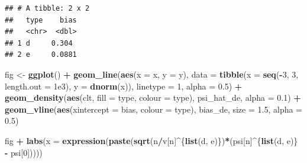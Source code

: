 \documentclass[]{article}
\newenvironment{Shaded}{\begin{snugshade}}{\end{snugshade}}
\newcommand{\DataTypeTok}[1]{\textcolor[rgb]{0.13,0.29,0.53}{#1}}
\newcommand{\DecValTok}[1]{\textcolor[rgb]{0.00,0.00,0.81}{#1}}
\newcommand{\FloatTok}[1]{\textcolor[rgb]{0.00,0.00,0.81}{#1}}
\newcommand{\KeywordTok}[1]{\textcolor[rgb]{0.13,0.29,0.53}{\textbf{#1}}}
\newcommand{\NormalTok}[1]{#1}
\newcommand{\OperatorTok}[1]{\textcolor[rgb]{0.81,0.36,0.00}{\textbf{#1}}}
\newcommand{\StringTok}[1]{\textcolor[rgb]{0.31,0.60,0.02}{#1}}
\theoremstyle{definition}
\theoremstyle{definition}
\theoremstyle{definition}
\theoremstyle{remark}
\begin{document}
\begin{Shaded}
\begin{Highlighting}[]
{{{{{{{{{\NormalTok{(bias_de <-}\StringTok{ }\NormalTok{psi_hat_de }\OperatorTok{%
\end{Highlighting}
\end{Shaded}

\begin{verbatim}
## # A tibble: 2 x 2
##   type    bias
##   <chr>  <dbl>
## 1 d     0.304 
## 2 e     0.0881
\end{verbatim}

\begin{Shaded}
\begin{Highlighting}[]
\NormalTok{fig <-}\StringTok{ }\KeywordTok{ggplot}\NormalTok{() }\OperatorTok{+}
\StringTok{  }\KeywordTok{geom_line}\NormalTok{(}\KeywordTok{aes}\NormalTok{(}\DataTypeTok{x =}\NormalTok{ x, }\DataTypeTok{y =}\NormalTok{ y), }
            \DataTypeTok{data =} \KeywordTok{tibble}\NormalTok{(}\DataTypeTok{x =} \KeywordTok{seq}\NormalTok{(}\OperatorTok{-}\DecValTok{3}\NormalTok{, }\DecValTok{3}\NormalTok{, }\DataTypeTok{length.out =} \FloatTok{1e3}\NormalTok{),}
                          \DataTypeTok{y =} \KeywordTok{dnorm}\NormalTok{(x)),}
            \DataTypeTok{linetype =} \DecValTok{1}\NormalTok{, }\DataTypeTok{alpha =} \FloatTok{0.5}\NormalTok{) }\OperatorTok{+}
\StringTok{  }\KeywordTok{geom_density}\NormalTok{(}\KeywordTok{aes}\NormalTok{(clt, }\DataTypeTok{fill =}\NormalTok{ type, }\DataTypeTok{colour =}\NormalTok{ type),}
\NormalTok{               psi_hat_de, }\DataTypeTok{alpha =} \FloatTok{0.1}\NormalTok{) }\OperatorTok{+}
\StringTok{  }\KeywordTok{geom_vline}\NormalTok{(}\KeywordTok{aes}\NormalTok{(}\DataTypeTok{xintercept =}\NormalTok{ bias, }\DataTypeTok{colour =}\NormalTok{ type),}
\NormalTok{             bias_de, }\DataTypeTok{size =} \FloatTok{1.5}\NormalTok{, }\DataTypeTok{alpha =} \FloatTok{0.5}\NormalTok{)}
  
\NormalTok{fig }\OperatorTok{+}
\StringTok{  }\KeywordTok{labs}\NormalTok{(}\DataTypeTok{x =} \KeywordTok{expression}\NormalTok{(}\KeywordTok{paste}\NormalTok{(}\KeywordTok{sqrt}\NormalTok{(n}\OperatorTok{/}\NormalTok{v[n]}\OperatorTok{^}\NormalTok{\{}\KeywordTok{list}\NormalTok{(d, e)\})}\OperatorTok{*}\NormalTok{(psi[n]}\OperatorTok{^}\NormalTok{\{}\KeywordTok{list}\NormalTok{(d, e)\} }\OperatorTok{-}\StringTok{ }\NormalTok{psi[}\DecValTok{0}\NormalTok{]))))}
\end{Highlighting}
\end{Shaded}
\end{document}
